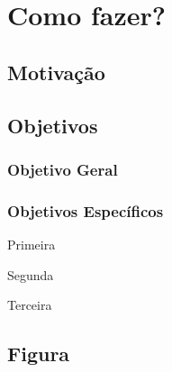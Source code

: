 \chapter{Como fazer?}
\label{cap:como_fazer}



\section{Motivação}
\label{sec:motivacao}


\section{Objetivos}
\label{sec:objetivos}



\subsection{Objetivo Geral}
\label{sec:objetivo-geral}


\subsection{Objetivos Específicos}
\label{sec:objetivos-especificos}



	\begin{alineas}
		\item Primeira
		\item Segunda
		\item Terceira
	\end{alineas}


\section{Figura}
\label{sec:figura}
	
	\begin{figure}[h!]
		\centering
	\end{figure}


